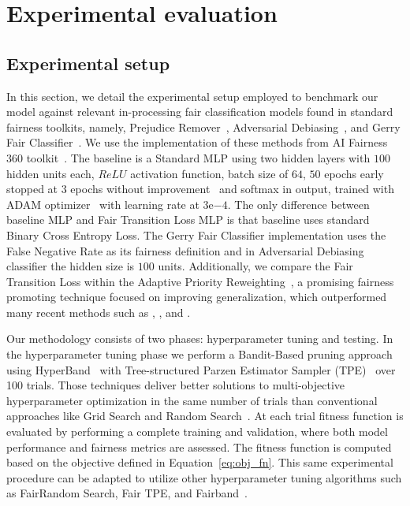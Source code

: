 \chapter{Experimental evaluation}


\section{Experimental setup} \label{sec:experimental}

In this section, we detail the experimental setup employed to benchmark our model against relevant in-processing fair classification models found in standard fairness toolkits, namely, Prejudice Remover~\citep{Kamishima2012}, Adversarial Debiasing~\citep{Zhang2018}, and Gerry Fair Classifier~\citep{kearns18a}. We use the implementation of these methods from AI Fairness 360 toolkit~\citep{aif360-oct-2018}. The baseline is a Standard MLP using two hidden layers with $100$ hidden units each, $ReLU$ activation function, batch size of $64$, $50$ epochs early stopped at $3$ epochs without improvement~\citep{Li2020} and softmax in output, trained with ADAM optimizer~\citep{KingmaB14} with learning rate at $3\mathrm{e}{-4}$. The only difference between baseline MLP and Fair Transition Loss MLP is that baseline uses standard Binary Cross Entropy Loss. The Gerry Fair Classifier implementation uses the False Negative Rate as its fairness definition and in Adversarial Debiasing classifier the hidden size is $100$ units. Additionally, we compare the Fair Transition Loss within the Adaptive Priority Reweighting~\cite{HuXT23}, a promising fairness promoting technique focused on improving generalization, which outperformed many recent methods such as \cite{jiang2020identifying}, \cite{mroueh2021fair}, and \cite{roh2020fairbatch}.

Our methodology consists of two phases: hyperparameter tuning and testing. In the hyperparameter tuning phase we perform a Bandit-Based pruning approach using HyperBand~\citep{Li2018} with Tree-structured Parzen Estimator Sampler (TPE)~\citep{bergstra2011} over 100 trials. Those techniques deliver better solutions to multi-objective hyperparameter optimization in the same number of trials than conventional approaches like Grid Search and Random Search~\citep{Morales-Hernandez2023}. At each trial fitness function is evaluated by performing a complete training and validation, where both model performance and fairness metrics are assessed. The fitness function is computed based on the objective defined in Equation~\ref{eq:obj_fn}. This same experimental procedure can be adapted to utilize other hyperparameter tuning algorithms such as FairRandom Search, Fair TPE, and Fairband~\citep{Cruz2021}.


